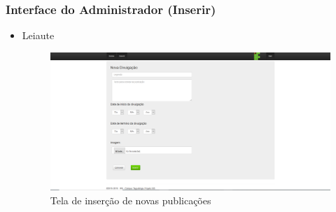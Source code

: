     \subsubsection{Interface do Administrador (Inserir)}
       \begin{itemize}
        \item Leiaute
            \begin{figure}[H]
                \centering
                \includegraphics[width=\textwidth]{figuras/telainserir}
                \caption{Tela de inserção de novas publicações}
            \end{figure}
        

\end{itemize}
